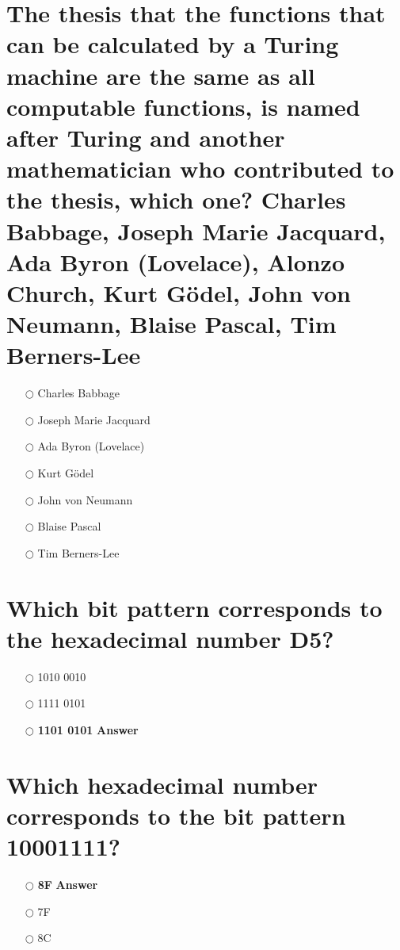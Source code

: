 \documentclass[a4paper,11pt,oneside]{book}
\begin{document}
\begin{sloppypar}
\section{The thesis that the functions that can be calculated by a Turing machine are the same as all computable functions, is named after Turing and another mathematician who contributed to the thesis, which one?  Charles Babbage, Joseph Marie Jacquard, Ada Byron (Lovelace), Alonzo Church, Kurt G\"odel, John von Neumann, Blaise Pascal, Tim Berners-Lee}

\label{q:442:mc:en:True}

\begin{itemize}
  \item[$\bigcirc$] Charles Babbage
  \item[$\bigcirc$] Joseph Marie Jacquard
  \item[$\bigcirc$] Ada Byron (Lovelace)
  \item[$\bigcirc$] Kurt G\"odel
  \item[$\bigcirc$] John von Neumann
  \item[$\bigcirc$] Blaise Pascal
  \item[$\bigcirc$] Tim Berners-Lee
\end{itemize}



\section{Which bit pattern corresponds to the hexadecimal number D5?}

\label{q:443:mc:en:True}

\begin{itemize}
  \item[$\bigcirc$] 1010 0010
  \item[$\bigcirc$] 1111 0101
  \item[$\bigcirc$] \textbf{1101 0101} \hfill \textbf{Answer}
\end{itemize}



\section{Which hexadecimal number corresponds to the bit pattern 10001111?}

\label{q:444:mc:en:True}

\begin{itemize}
  \item[$\bigcirc$] \textbf{8F} \hfill \textbf{Answer}
  \item[$\bigcirc$] 7F
  \item[$\bigcirc$] 8C
\end{itemize}










\end{sloppypar}
\end{document}
